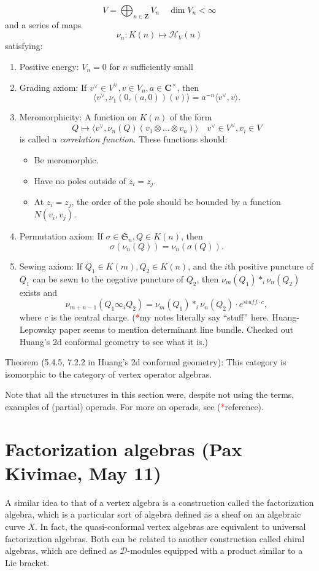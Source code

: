 \documentclass{article}
\newcommand{\CC}{\mathbold{C}}
\newcommand{\ZZ}{\mathbold{Z}}
\newcommand{\Hh}{\mathcal{H}}
\newcommand{\Dd}{\mathcal{D}}
\newcommand{\tk}{\textcolor{red}{*}}
\newcommand{\Sym}{\mathfrak{S}}
\begin{document}
\[V = \bigoplus_{n \in \ZZ} V_n \quad \dim V_n < \infty \]
and a series of maps
\[\nu_n: K(n) \mapsto \Hh_V(n) \]
satisfying:
\begin{enumerate}
\item Positive energy: $V_n=0$ for $n$ sufficiently small
\item Grading axiom: If $v^\vee \in V^\vee, v \in V_n, a \in \CC^\times$, then
  \[\langle v^\vee,\nu_1(0,(a,0))(v)\rangle = a^{-n}\langle v^\vee,v \rangle. \]
\item Meromorphicity: A function on $K(n)$ of the form
  \[Q \mapsto \langle v^\vee, \nu_n(Q)(v_1 \otimes ... \otimes v_n) \rangle \quad v^\vee \in V^\vee, v_i \in V \]
  is called a \textit{correlation function}.  These functions should:
  \begin{itemize}
  \item Be meromorphic.
  \item Have no poles outside of $z_i=z_j$.
  \item At $z_i=z_j$, the order of the pole should be bounded by a function $N(v_i,v_j)$.
  \end{itemize}
\item Permutation axiom: If $\sigma \in \Sym_n, Q \in K(n)$, then
\[\sigma(\nu_n(Q))=\nu_n(\sigma(Q)). \]
\item Sewing axiom: If $Q_1 \in K(m), Q_2 \in K(n)$, and the $i$th positive puncture of $Q_1$ can be sewn to the negative puncture of $Q_2$, then $\nu_m(Q_1) *_i \nu_n(Q_2)$ exists and
\[\nu_{m+n-1}(Q_1 \infty_i Q_2) = \nu_m(Q_1) *_i \nu_n(Q_2) \cdot e^{stuff \cdot c}, \]
where $c$ is the central charge. (\tk my notes literally say ``stuff'' here.  Huang-Lepowsky paper seems to mention determinant line bundle. Checked out Huang's 2d conformal geometry to see what it is.)
\end{enumerate}
Theorem (5.4.5, 7.2.2 in Huang's 2d conformal geometry): This category is isomorphic to the category of vertex operator algebras.

Note that all the structures in this section were, despite not using the terms, examples of (partial) operads. For more on operads, see (\tk reference).
\section{Factorization algebras (Pax Kivimae, May 11)}
A similar idea to that of a vertex algebra is a construction called the factorization algebra, which is a particular sort of algebra defined as a sheaf on an algebraic curve $X$.  In fact, the quasi-conformal vertex algebras are equivalent to universal factorization algebras.  Both can be related to another construction called chiral algebras, which are defined as $\Dd$-modules equipped with a product similar to a Lie bracket.
\end{document}

